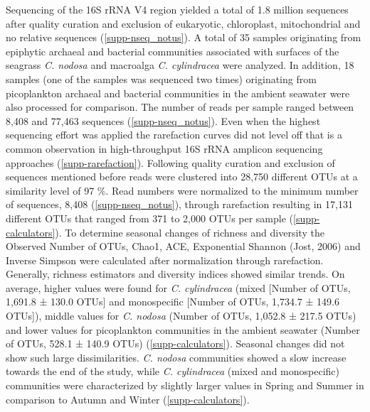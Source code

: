 \documentclass[12pt,]{article}
\begin{document}
Sequencing of the 16S rRNA V4 region yielded a total of 1.8 million
sequences after quality curation and exclusion of eukaryotic,
chloroplast, mitochondrial and no relative sequences
(\autoref{supp-nseq_notus}). A total of 35 samples originating from
epiphytic archaeal and bacterial communities associated with surfaces of
the seagrass \emph{C. nodosa} and macroalga \emph{C. cylindracea} were
analyzed. In addition, 18 samples (one of the samples was sequenced two
times) originating from picoplankton archaeal and bacterial communities
in the ambient seawater were also processed for comparison. The number
of reads per sample ranged between 8,408 and 77,463 sequences
(\autoref{supp-nseq_notus}). Even when the highest sequencing effort was
applied the rarefaction curves did not level off that is a common
observation in high-throughput 16S rRNA amplicon sequencing approaches
(\autoref{supp-rarefaction}). Following quality curation and exclusion
of sequences mentioned before reads were clustered into 28,750 different
OTUs at a similarity level of 97 \si{\percent}. Read numbers were
normalized to the minimum number of sequences, 8,408
(\autoref{supp-nseq_notus}), through rarefaction resulting in 17,131
different OTUs that ranged from 371 to 2,000 OTUs per sample
(\autoref{supp-calculators}). To determine seasonal changes of richness
and diversity the Observed Number of OTUs, Chao1, ACE, Exponential
Shannon (Jost, 2006) and Inverse Simpson were calculated after
normalization through rarefaction. Generally, richness estimators and
diversity indices showed similar trends. On average, higher values were
found for \emph{C. cylindracea} (mixed {[}Number of OTUs, 1,691.8 ±
130.0 OTUs{]} and monospecific {[}Number of OTUs, 1,734.7 ± 149.6
OTUs{]}), middle values for \emph{C. nodosa} (Number of OTUs, 1,052.8 ±
217.5 OTUs) and lower values for picoplankton communities in the ambient
seawater (Number of OTUs, 528.1 ± 140.9 OTUs)
(\autoref{supp-calculators}). Seasonal changes did not show such large
dissimilarities. \emph{C. nodosa} communities showed a slow increase
towards the end of the study, while \emph{C. cylindracea} (mixed and
monospecific) communities were characterized by slightly larger values
in Spring and Summer in comparison to Autumn and Winter
(\autoref{supp-calculators}).
\end{document}
